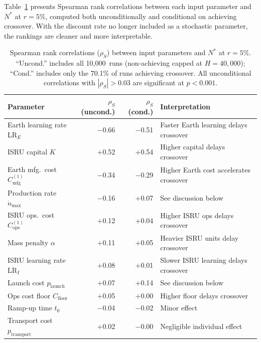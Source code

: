 \documentclass[preprint,12pt]{elsarticle}
\begin{document}
Table~\ref{tab:spearman} presents Spearman rank correlations between each input parameter and $N^*$ at $r = 5\%$, computed both unconditionally and conditional on achieving crossover. With the discount rate no longer included as a stochastic parameter, the rankings are cleaner and more interpretable.

\begin{table}[htbp]
\centering
\caption{Spearman rank correlations ($\rho_S$) between input parameters and $N^*$ at $r = 5\%$. ``Uncond.'' includes all 10{,}000~runs (non-achieving capped at $H = 40{,}000$); ``Cond.'' includes only the 70.1\% of runs achieving crossover. All unconditional correlations with $|\rho_S| > 0.03$ are significant at $p < 0.001$.}
\label{tab:spearman}
\begin{tabular}{@{}lrrl@{}}
\toprule
Parameter & $\rho_S$ (uncond.) & $\rho_S$ (cond.) & Interpretation \\
\midrule
Earth learning rate LR$_E$     & $-$0.66 & $-$0.51 & Faster Earth learning delays crossover \\
ISRU capital $K$               & $+$0.52 & $+$0.54 & Higher capital delays crossover \\
Earth mfg.\ cost $C_{\mathrm{mfg}}^{(1)}$ & $-$0.34 & $-$0.29 & Higher Earth cost accelerates crossover \\
Production rate $\dot{n}_{\max}$ & $-$0.16 & $+$0.07 & See discussion below \\
ISRU ops.\ cost $C_{\mathrm{ops}}^{(1)}$ & $+$0.12 & $+$0.04 & Higher ISRU ops delays crossover \\
Mass penalty $\alpha$          & $+$0.11 & $+$0.05 & Heavier ISRU units delay crossover \\
ISRU learning rate LR$_I$      & $+$0.08 & $+$0.01 & Slower ISRU learning delays crossover \\
Launch cost $p_{\mathrm{launch}}$   & $+$0.07 & $+$0.14 & See discussion below \\
Ops cost floor $C_{\mathrm{floor}}$ & $+$0.05 & $+$0.00 & Higher floor delays crossover \\
Ramp-up time $t_0$             & $-$0.04 & $-$0.02 & Minor effect \\
Transport cost $p_{\mathrm{transport}}$ & $+$0.02 & $-$0.00 & Negligible individual effect \\
\bottomrule
\end{tabular}
\end{table}
\end{document}
